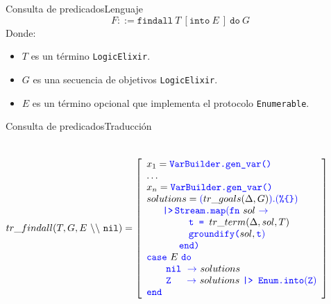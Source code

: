 \documentclass[14pt,aspectratio=169]{beamer}
\begin{document}
\begin{frame}{Consulta de predicados}{Lenguaje}
  \begin{equation*}
    F ::= \texttt{findall}\ T\ [\texttt{into}\ E\ ]\ \texttt{do}\ G
  \end{equation*}
  Donde:
  \begin{itemize}
    \item $T$ es un término \texttt{LogicElixir}.
    \item $G$ es una secuencia de objetivos \texttt{LogicElixir}.
    \item $E$ es un término opcional que implementa el protocolo \texttt{Enumerable}.
  \end{itemize}
\end{frame}

\begin{frame}{Consulta de predicados}{Traducción}
  \begin{columns}
    \footnotesize \begin{align*}
        tr\_findall(T, G, E\ \backslash\backslash\ \texttt{nil}) = \left[
        \begin{array}{lcr}
          x_1 = \textcolor{blue}{\texttt{VarBuilder.gen\_var()}} \\
          \ldots \\
          x_n = \textcolor{blue}{\texttt{VarBuilder.gen\_var()}} \\
          solutions = \textcolor{blue}{(}tr\_goals(\Delta, G)\textcolor{blue}{)}\textcolor{blue}{.(\texttt{\%\{\}})} \\
          \ \ \ \ \ \textcolor{blue}{\texttt{|>\,Stream.map}(\texttt{fn}}\ sol\ \textcolor{blue}{\rightarrow} \\
          \ \ \ \ \ \ \ \ \ \ \ \ \ \textcolor{blue}{\texttt{t =\ }} tr\_term(\Delta, sol, T) \\
          \ \ \ \ \ \ \ \ \ \ \ \ \ \textcolor{blue}{\texttt{groundify(}}sol, \textcolor{blue}{\texttt{t})} \\
          \ \ \ \ \ \ \ \ \ \ \textcolor{blue}{\texttt{end)}} \\
          \textcolor{blue}{\texttt{case}}\ E \ \textcolor{blue}{\texttt{do}} \\
          \ \ \ \ \ \ \textcolor{blue}{\texttt{nil}\ \rightarrow\ } solutions \\
          \ \ \ \ \ \ \textcolor{blue}{\texttt{Z} \ \ \ \ \rightarrow\ } solutions \textcolor{blue}{\ \texttt{|>\ Enum.into}(\texttt{Z})} \\
          \textcolor{blue}{\texttt{end}}
        \end{array}
      \right]
    \end{align*}
  \end{columns}
\end{frame}
\end{document}
